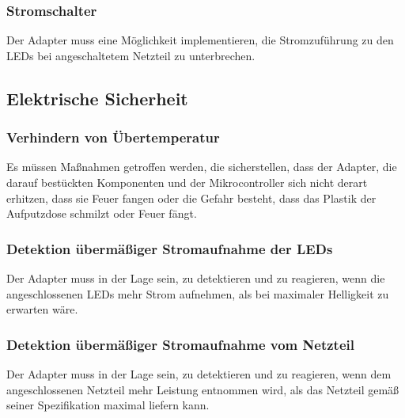 \subsubsection{Stromschalter}
Der Adapter muss eine M\"oglichkeit implementieren,
die Stromzuf\"uhrung zu den LEDs
bei angeschaltetem Netzteil zu unterbrechen.

\newpage
\subsection{Elektrische Sicherheit}
\subsubsection{Verhindern von \"Ubertemperatur}
Es m\"ussen Ma{\ss}nahmen getroffen werden, die sicherstellen,
dass der Adapter,
die darauf best\"uckten Komponenten
und der Mikrocontroller
sich nicht derart erhitzen,
dass sie Feuer fangen oder die Gefahr besteht,
dass das Plastik der Aufputzdose
schmilzt oder Feuer f\"angt.

\subsubsection{Detektion \"uberm\"a{\ss}iger Stromaufnahme der LEDs}
Der Adapter muss in der Lage sein, zu detektieren und zu reagieren,
wenn die angeschlossenen LEDs mehr Strom aufnehmen,
als bei maximaler Helligkeit zu erwarten w\"are.

\subsubsection{Detektion \"uberm\"a{\ss}iger Stromaufnahme vom Netzteil}
Der Adapter muss in der Lage sein, zu detektieren und zu reagieren,
wenn dem angeschlossenen Netzteil mehr Leistung entnommen wird,
als das Netzteil gem\"a{\ss} seiner Spezifikation maximal liefern kann.
